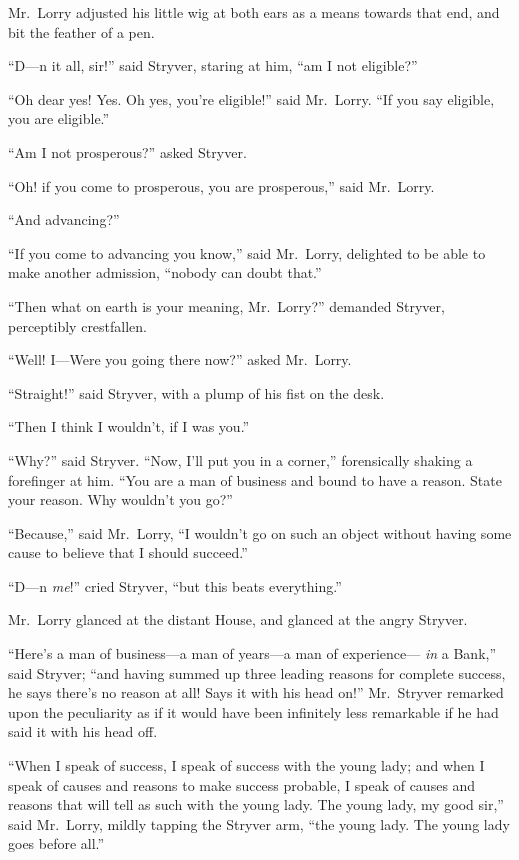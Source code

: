Mr.\ Lorry adjusted his little wig at both ears as a means towards
that end, and bit the feather of a pen.

``D---n it all, sir!'' said Stryver, staring at him, ``am I not eligible?''

``Oh dear yes!  Yes.  Oh yes, you're eligible!'' said Mr.\ Lorry.  ``If you
say eligible, you are eligible.''

``Am I not prosperous?'' asked Stryver.

``Oh! if you come to prosperous, you are prosperous,'' said  Mr.\ Lorry.

``And advancing?''

``If you come to advancing you know,'' said Mr.\ Lorry, delighted to be
able to make another admission, ``nobody can doubt that.''

``Then what on earth is your meaning, Mr.\ Lorry?'' demanded Stryver,
perceptibly crestfallen.

``Well!  I---Were you going there now?'' asked Mr.\ Lorry.

``Straight!'' said Stryver, with a plump of his fist on the desk.

``Then I think I wouldn't, if I was you.''

``Why?'' said Stryver.  ``Now, I'll put you in a corner,'' forensically
shaking a forefinger at him.  ``You are a man of business and bound
to have a reason.  State your reason.  Why wouldn't you go?''

``Because,'' said Mr.\ Lorry, ``I wouldn't go on such an object without
having some cause to believe that I should succeed.''

``D---n \emph{me}!'' cried Stryver, ``but this beats everything.''

Mr.\ Lorry glanced at the distant House, and glanced at the angry Stryver.

``Here's a man of business---a man of years---a man of experience---%
\emph{in} a Bank,'' said Stryver; ``and having summed up three leading reasons
for complete success, he says there's no reason at all!  Says it with
his head on!''  Mr.\ Stryver remarked upon the peculiarity as if it would
have been infinitely less remarkable if he had said it with his head off.

``When I speak of success, I speak of success with the young lady; and
when I speak of causes and reasons to make success probable, I speak
of causes and reasons that will tell as such with the young lady.
The young lady, my good sir,'' said Mr.\ Lorry, mildly tapping the
Stryver arm, ``the young lady.  The young lady goes before all.''

